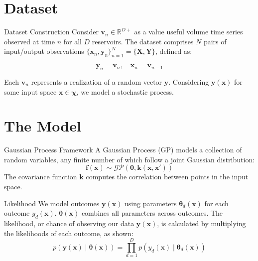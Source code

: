 \documentclass[10pt, xcolor=table]{beamer}
\begin{document}
\section*{Dataset}
\begin{frame}{Dataset Construction}
Consider $\mathbf{v}_{n} \in \mathbb{R}^{D+}$ as a value useful volume time series observed at time $n$ for all $D$ reservoirs. The dataset comprises $N$ pairs of input/output observations $\{\mathbf{x}_n, \mathbf{y}_n\}_{n=1}^N = \{\mathbf{X}, \mathbf{Y}\}$, defined as:

\begin{equation*}
    \mathbf{y}_n = \mathbf{v}_{n}, \quad \mathbf{x}_n = \mathbf{v}_{n-1}
\end{equation*}

Each $\mathbf{v}_n$ represents a realization of a random vector $\bm{y}$. Considering $\bm{y}(\bm{x})$ for some input space $\bm{x} \in \mathbf{\chi}$, we model a stochastic process.
\end{frame}

\section*{The Model}

\begin{frame}{Gaussian Process Framework}
A Gaussian Process (GP) models a collection of random variables, any finite number of which follow a joint Gaussian distribution:
\begin{equation*}
    \bm{f}(\mathbf{x}) \sim \mathcal{GP}(\mathbf{0}, \bm{k}(\mathbf{x}, \mathbf{x}'))
\end{equation*}
The covariance function $\bm{k}$ computes the correlation between points in the input space.
\end{frame}

\begin{frame}{Likelihood}
We model outcomes $\mathbf{y}(\mathbf{x})$ using parameters $\boldsymbol{\theta}_d(\mathbf{x})$ for each outcome $y_d(\mathbf{x})$. $\boldsymbol{\theta}(\mathbf{x})$ combines all parameters across outcomes. The likelihood, or chance of observing our data $\mathbf{y}(\mathbf{x})$, is calculated by multiplying the likelihoods of each outcome, as shown:
\begin{equation*}
    p(\mathbf{y}(\mathbf{x}) \mid \boldsymbol{\theta}(\mathbf{x})) = \prod_{d=1}^D p(y_{d}(\mathbf{x}) \mid \boldsymbol{\theta}_{d}(\mathbf{x}))
\end{equation*}
\end{frame}
\end{document}
